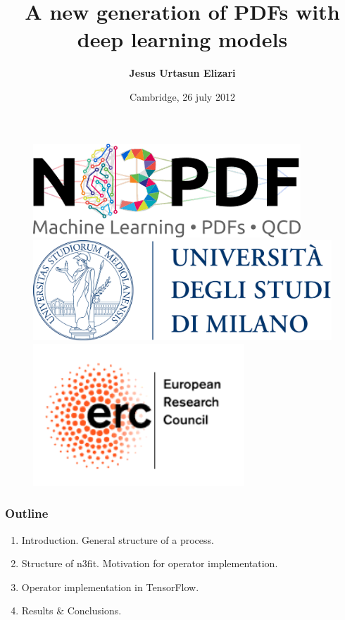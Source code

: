 \documentclass[aspectratio=43]{beamer}
\title{A new generation of PDFs with deep learning models}
\author{\textbf {Jesus Urtasun Elizari}}
\institute{\textbf {University of Milan}}
\date{Cambridge, 26 july 2012}
\begin{document}
\begin{frame}



	\begin{figure}
		\includegraphics[width = 2.5 cm]{n3pdf.png}
		\hfill
		\includegraphics[width = 2.5 cm]{unimi.png}
		\hfill
		\includegraphics[width = 2.5 cm]{erc.png}
		\endminipage
	\end{figure}

\end{frame}

\begin{frame}

	\frametitle{Outline}
	
	\begin{enumerate}
		\item Introduction. General structure of a process.
		\item Structure of {\color{violet}n3fit}. Motivation for operator implementation.
		\item Operator implementation in TensorFlow.
		\item Results $\&$ Conclusions.
	\end{enumerate}
	
\end{frame}
\end{document}
